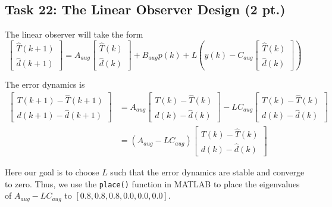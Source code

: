 \documentclass[a4paper,twoside,11pt]{article}
\numberwithin{equation}{section}
\begin{document}
\subsection{Task 22: The Linear Observer Design (2 pt.)}

The linear observer will take the form 
\begin{equation}
    \begin{bmatrix}
    \hat{T}(k+1)\\
    \hat{d}(k+1)
    \end{bmatrix}
    = A_{aug}
    \begin{bmatrix}
    \hat{T}(k)\\
    \hat{d}(k)
    \end{bmatrix}
    + B_{aug}p(k)
    + L\left(y(k)-C_{aug}\begin{bmatrix}
    \hat{T}(k)\\
    \hat{d}(k)\end{bmatrix}\right)
\end{equation}

The error dynamics is
\begin{equation}
    \begin{split}
        \begin{bmatrix}
        T(k+1)-\hat{T}(k+1)\\
        d(k+1)-\hat{d}(k+1)
        \end{bmatrix}
        &=
        A_{aug}
        \begin{bmatrix}
        T(k)-\hat{T}(k)\\
        d(k)-\hat{d}(k)
        \end{bmatrix}
        -LC_{aug}
        \begin{bmatrix}
        T(k)-\hat{T}(k)\\
        d(k)-\hat{d}(k)
        \end{bmatrix} \\
        &=
        (A_{aug}-LC_{aug})
        \begin{bmatrix}
        T(k)-\hat{T}(k)\\
        d(k)-\hat{d}(k)
        \end{bmatrix}
    \end{split}
\end{equation}

Here our goal is to choose $L$ such that the error dynamics are stable and converge to zero. Thus, we use the \verb|place()| function in MATLAB to place the eigenvalues of $A_{aug}-LC_{aug}$ to $[0.8, 0.8, 0.8, 0.0, 0.0, 0.0]$. 
\end{document}
